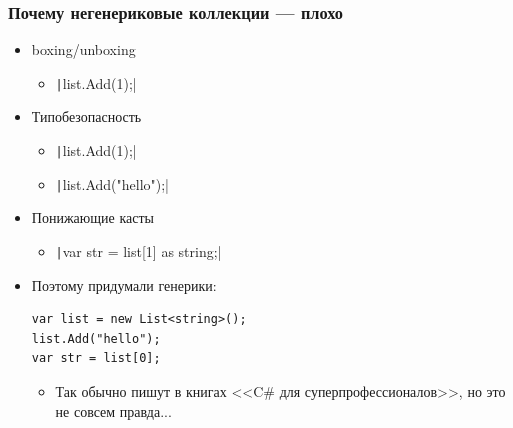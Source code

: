 \documentclass[xetex,mathserif,serif]{beamer}
\begin{document}
	\begin{frame}[fragile]
		\frametitle{Почему негенериковые коллекции --- плохо}
		\begin{itemize}
			\item boxing/unboxing
			\begin{itemize}
				\item \texttt|list.Add(1);|
			\end{itemize}
			\item Типобезопасность
			\begin{itemize}
				\item \texttt|list.Add(1);|
				\item \texttt|list.Add("hello");|
			\end{itemize}
			\item Понижающие касты
			\begin{itemize}
				\item \texttt|var str = list[1] as string;|
			\end{itemize}
			\item Поэтому придумали генерики:
			\begin{verbatim}
var list = new List<string>();
list.Add("hello");
var str = list[0];
			\end{verbatim}
			\begin{itemize}
				\item Так обычно пишут в книгах <<C\# для суперпрофессионалов>>, но это не совсем правда...
			\end{itemize}
		\end{itemize}
	\end{frame}
\end{document}
